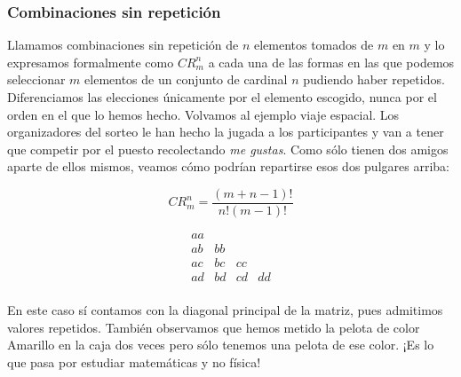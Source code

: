 \subsubsection{Combinaciones sin repetición}

Llamamos combinaciones sin repetición de $n$ elementos tomados de $m$ en $m$ y lo expresamos formalmente como $CR_{m}^{n}$ a cada una de las formas en las que podemos seleccionar $m$ elementos de un conjunto de cardinal $n$ pudiendo haber repetidos.
Diferenciamos las elecciones únicamente por el elemento escogido, nunca por el orden en el que lo hemos hecho.
Volvamos al ejemplo viaje espacial.
Los organizadores del sorteo le han hecho la jugada a los participantes y van a tener que competir por el puesto recolectando \textit{me gustas}.
Como sólo tienen dos amigos aparte de ellos mismos, veamos cómo podrían repartirse esos dos pulgares arriba:

\[CR_{m}^{n} = \frac{(m+n-1)!}{n!(m-1)!}\]

\[
\begin{array}{cccc}
	aa &    &    &    \\
	ab & bb &    &    \\
	ac & bc & cc &    \\
	ad & bd & cd & dd \\
\end{array}
\]

En este caso sí contamos con la diagonal principal de la matriz, pues admitimos valores repetidos.
También observamos que hemos metido la pelota de color Amarillo en la caja dos veces pero sólo tenemos una pelota de ese color.
¡Es lo que pasa por estudiar matemáticas y no física!
